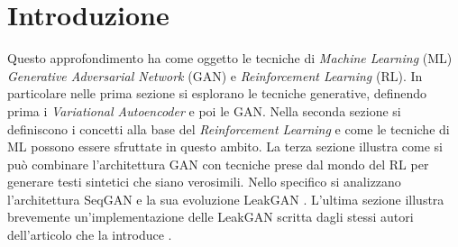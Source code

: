 
\section{Introduzione}

Questo approfondimento ha come oggetto le tecniche di \emph{Machine Learning} (ML) \emph{Generative Adversarial Network} (GAN) e \emph{Reinforcement Learning} (RL).
In  particolare nelle  prima sezione si  esplorano le tecniche generative, definendo prima i \emph{Variational  Autoencoder} e  poi le GAN.
Nella seconda sezione si definiscono i concetti alla base  del  \emph{Reinforcement Learning} e come le tecniche di ML possono essere sfruttate in questo ambito.
La terza  sezione illustra come si può combinare l'architettura GAN con tecniche prese dal mondo del RL per generare testi sintetici che siano verosimili.
Nello specifico si analizzano l'architettura SeqGAN \cite{SeqGAN} e la sua evoluzione LeakGAN \cite{LeakGAN}.
L'ultima sezione illustra brevemente un'implementazione delle LeakGAN scritta dagli stessi autori dell'articolo che la introduce \cite{LeakGAN}.
